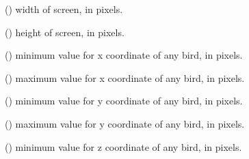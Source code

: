 \documentclass[a4paper,11pt,oneside,english]{sphinxmanual}
\begin{document}
\bigskip 
\bigskip 


\begin{fulllineitems}
() width of screen, in pixels.

\end{fulllineitems}



\begin{fulllineitems}
() height of screen, in pixels.

\end{fulllineitems}


\bigskip 
\bigskip 


\begin{fulllineitems}
() minimum value for x coordinate of any bird, in pixels.

\end{fulllineitems}



\begin{fulllineitems}
() maximum value for x coordinate of any bird, in pixels.

\end{fulllineitems}



\begin{fulllineitems}
() minimum value for y coordinate of any bird, in pixels.

\end{fulllineitems}



\begin{fulllineitems}
() maximum value for y coordinate of any bird, in pixels.

\end{fulllineitems}



\begin{fulllineitems}
() minimum value for z coordinate of any bird, in pixels.

\end{fulllineitems}
\end{document}
